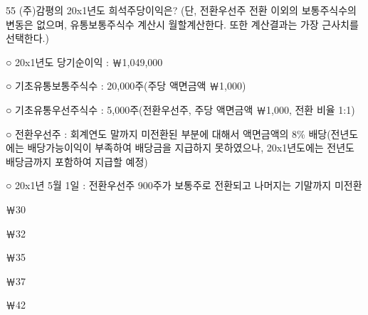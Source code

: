 \begin{question}{55}
(주)감평의 20x1년도 희석주당이익은? (단, 전환우선주 전환 이외의 보통주식수의 변동은 없으며, 유통보통주식수 계산시 월할계산한다. 또한 계산결과는 가장 근사치를 선택한다.)
\begin{framedtext}
○ 20x1년도 당기순이익 : ￦1,049,000 \par
○ 기초유통보통주식수 : 20,000주(주당 액면금액 ￦1,000) \par
○ 기초유통우선주식수 : 5,000주(전환우선주, 주당 액면금액 ￦1,000, 전환 비율 1:1) \par
○ 전환우선주 : 회계연도 말까지 미전환된 부분에 대해서 액면금액의 8\% 배당(전년도에는 배당가능이익이 부족하여 배당금을 지급하지 못하였으나, 20x1년도에는 전년도 배당금까지 포함하여 지급할 예정) \par
○ 20x1년 5월 1일 : 전환우선주 900주가 보통주로 전환되고 나머지는 기말까지 미전환 \par
\end{framedtext}
\begin{choices}
  \item ￦30
  \item ￦32
  \item ￦35
  \item ￦37
  \item ￦42
\end{choices}
\end{question}
